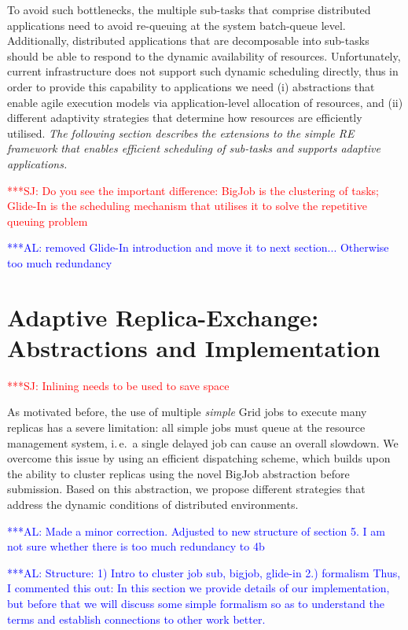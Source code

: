 \documentclass{rspublic}
\newcommand{\alnote}[1]{ {\textcolor{blue} { ***AL: #1 }}}
\newcommand{\jhanote}[1]{ {\textcolor{red} { ***SJ: #1 }}}
\newcommand{\alnote}[1]{}
\newcommand{\jhanote}[1]{}
\begin{document}
To avoid such bottlenecks, the multiple sub-tasks that comprise
distributed applications need to avoid re-queuing at the system
batch-queue level.  Additionally, distributed applications that are
decomposable into sub-tasks should be able to respond to the dynamic
availability of resources.  Unfortunately, current infrastructure does
not support such dynamic scheduling directly, thus in order to provide
this capability to applications we need (i) abstractions that enable
agile execution models via application-level allocation of resources,
and (ii) different adaptivity strategies that determine how resources
are efficiently utilised.  {\it The following section describes the
  extensions to the simple RE framework that enables efficient
  scheduling of sub-tasks and supports adaptive applications.}




\jhanote{Do you see the important difference: BigJob is the clustering
  of tasks; Glide-In is the scheduling mechanism that utilises it to
  solve the repetitive queuing problem}

\alnote{removed Glide-In introduction and move it to next
  section... Otherwise too much redundancy}
\vspace{-0.25in}
\section{Adaptive Replica-Exchange: Abstractions and Implementation}
\label{sec:glidein}
\jhanote{Inlining needs to be used to save space}

As motivated before, the use of multiple {\it simple} Grid jobs to
execute many replicas has a severe limitation: all simple jobs must
queue at the resource management system, i.\,e.\ a single delayed
job can cause an overall slowdown.  We overcome
this issue by using an efficient dispatching scheme, which builds upon
the ability to cluster replicas using the novel BigJob abstraction
before submission. Based on this abstraction, we propose different
strategies that address the dynamic conditions of distributed
environments.

\alnote{Made a minor correction. Adjusted to new structure of section
  5. I am not sure whether there is too much redundancy to 4b}

\alnote{Structure: 1) Intro to cluster job sub, bigjob, glide-in 2.)
  formalism Thus, I commented this out: In this section we provide
  details of our implementation, but before that we will discuss some
  simple formalism so as to understand the terms and establish
  connections to other work better.  }
\end{document}
